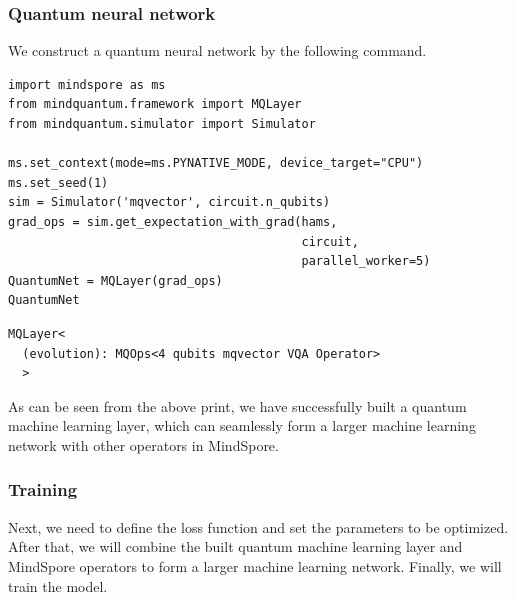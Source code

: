 \subsubsection{Quantum neural network}
We construct a quantum neural network by the following command.

\begin{lstlisting}
import mindspore as ms                                                                         
from mindquantum.framework import MQLayer                                                      
from mindquantum.simulator import Simulator

ms.set_context(mode=ms.PYNATIVE_MODE, device_target="CPU")
ms.set_seed(1)                                                                                 
sim = Simulator('mqvector', circuit.n_qubits)
grad_ops = sim.get_expectation_with_grad(hams,
                                         circuit,
                                         parallel_worker=5)
QuantumNet = MQLayer(grad_ops)          
QuantumNet
\end{lstlisting}

\begin{lstlisting}
MQLayer<
  (evolution): MQOps<4 qubits mqvector VQA Operator>
  >
\end{lstlisting}

As can be seen from the above print, we have successfully built a quantum machine learning layer, which can seamlessly form a larger machine learning network with other operators in MindSpore.

\subsubsection{Training}
Next, we need to define the loss function and set the parameters to be optimized. After that, we will combine the built quantum machine learning layer and MindSpore operators to form a larger machine learning network. Finally, we will train the model. %

